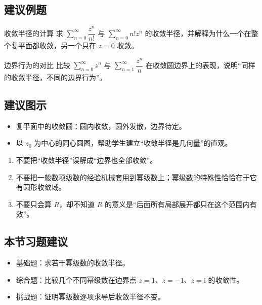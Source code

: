\subsection*{建议例题}
\begin{lizi}{收敛半径的计算}{}
求 $\sum_{n=0}^{\infty} \dfrac{z^n}{n!}$ 与 $\sum_{n=0}^{\infty} n! z^n$ 的收敛半径，并解释为什么一个在整个复平面都收敛，另一个只在 $z=0$ 收敛。
\end{lizi}

\begin{lizi}{边界行为的对比}{}
比较 $\sum_{n=0}^{\infty} z^n$ 与 $\sum_{n=1}^{\infty} \dfrac{z^n}{n}$ 在收敛圆边界上的表现，说明``同样的收敛半径，不同的边界行为''。
\end{lizi}

\subsection*{建议图示}
\begin{itemize}
    \item 复平面中的收敛圆：圆内收敛，圆外发散，边界待定。
    \item 以 $z_0$ 为中心的同心圆图，帮助学生建立``收敛半径是几何量''的直观。
\end{itemize}

\begin{jinshi}[本节易错点]
\begin{enumerate}
    \item 不要把``收敛半径''误解成``边界也全部收敛''。
    \item 不要把一般数项级数的经验机械套用到幂级数上；幂级数的特殊性恰恰在于它有圆形收敛域。
    \item 不要只会算 $R$，却不知道 $R$ 的意义是``后面所有局部展开都只在这个范围内有效''。
\end{enumerate}
\end{jinshi}

\subsection*{本节习题建议}
\begin{itemize}
    \item 基础题：求若干幂级数的收敛半径。
    \item 综合题：比较几个不同幂级数在边界点 $z=1$、$z=-1$、$z=\mathrm{i}$ 的收敛性。
    \item 挑战题：证明幂级数逐项求导后收敛半径不变。
\end{itemize}

